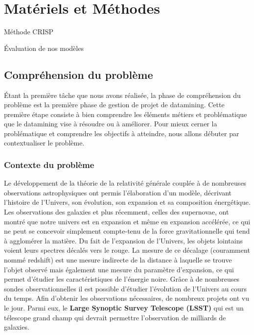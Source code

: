 \chapter{Matériels et Méthodes}

Méthode CRISP\cite{crisp}

Évaluation de nos modèles \cite{plasticc_team_2019_2539456}
\section{Compréhension du problème}
Étant la première tâche que nous avons réalisée, la phase de compréhension du problème est la première phase de gestion de projet de datamining. Cette première étape consiste à bien comprendre les éléments métiers et problématique que le datamining vise à résoudre ou à améliorer.
Pour mieux cerner la problématique et comprendre les objectifs à atteindre, nous allons débuter par contextualiser le problème.
\subsection{Contexte du problème}
Le développement de la théorie de la relativité générale couplée à de nombreuses observations astrophysiques ont permis l'élaboration d'un modèle, décrivant l'histoire de l'Univers, son évolution, son expansion et sa composition énergétique.
Les observations des galaxies et plus récemment, celles des supernovae, ont montré que notre univers est en expansion et même en expansion accélérée, ce qui ne peut se concevoir simplement compte-tenu de la force gravitationnelle qui tend à agglomérer la matière.
Du fait de l'expansion de l'Univers, les objets lointains voient leurs spectres décalés vers le rouge. La mesure de ce décalage (couramment nommé redshift) est une mesure indirecte de la distance à laquelle se trouve l'objet observé mais également une mesure du paramètre d'expansion, ce qui permet d'étudier les caractéristiques de l'énergie noire. Grâce à de nombreuses sondes observationnelles il est possible d'étudier l'évolution de l'Univers au cours du temps.
Afin d'obtenir les observations nécessaires, de nombreux projets ont vu le jour. Parmi eux, le \textbf{Large Synoptic Survey Telescope (LSST)} qui est un télescope grand champ qui devrait permettre l'observation de milliards de galaxies.

